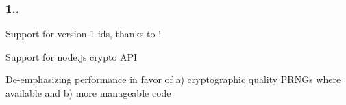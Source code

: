 \subsubsection*{1..}


\begin{DoxyItemize}
\item Support for version 1 ids, thanks to \href{https://github.com/ctavan}{\tt }!
\item Support for node.\+js crypto A\+PI
\item De-\/emphasizing performance in favor of a) cryptographic quality P\+R\+N\+Gs where available and b) more manageable code 
\end{DoxyItemize}